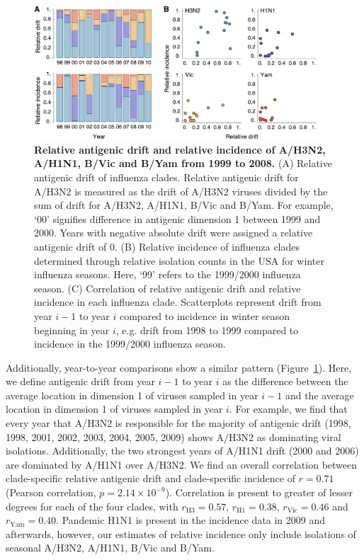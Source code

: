 \documentclass[11pt,oneside,letterpaper]{article}
\begin{document}
\begin{figure}[tb]
	\centering		
	\includegraphics[width=0.95\textwidth]{figures/incidence}
	\caption{\textbf{Relative antigenic drift and relative incidence of A/H3N2, A/H1N1, B/Vic and B/Yam from 1999 to 2008.} 
	(A) Relative antigenic drift of influenza clades.
	Relative antigenic drift for A/H3N2 is measured as the drift of A/H3N2 viruses divided by the sum of drift for A/H3N2, A/H1N1, B/Vic and B/Yam.
	For example, `00' signifies difference in antigenic dimension 1 between 1999 and 2000.
	Years with negative absolute drift were assigned a relative antigenic drift of 0.
	(B) Relative incidence of influenza clades determined through relative isolation counts in the USA for winter influenza seasons.
	Here, `99' refers to the 1999/2000 influenza season.
	(C) Correlation of relative antigenic drift and relative incidence in each influenza clade.
	Scatterplots represent drift from year $i-1$ to year $i$ compared to incidence in winter season beginning in year $i$, e.g. drift from 1998 to 1999 compared to incidence in the 1999/2000 influenza season.
	} 
	\label{incidence} 
\end{figure}

Additionally, year-to-year comparisons show a similar pattern (Figure~\ref{incidence}). 
Here, we define antigenic drift from year $i-1$ to year $i$ as the difference between the average location in dimension 1 of viruses sampled in year $i-1$ and the average location in dimension 1 of viruses sampled in year $i$.
For example, we find that every year that A/H3N2 is responsible for the majority of antigenic drift (1998, 1998, 2001, 2002, 2003, 2004, 2005, 2009) shows A/H3N2 as dominating viral isolations.
Additionally, the two strongest years of A/H1N1 drift (2000 and 2006) are dominated by A/H1N1 over A/H3N2.
We find an overall correlation between clade-specific relative antigenic drift and clade-specific incidence of $r = 0.71$ (Pearson correlation, $p = 2.14 \times 10^{-9}$).
Correlation is present to greater of lesser degrees for each of the four clades, with $r_\mathrm{H3} = 0.57$, $r_\mathrm{H1} = 0.38$, $r_\mathrm{Vic} = 0.46$ and $r_\mathrm{Yam} = 0.40$.
Pandemic H1N1 is present in the incidence data in 2009 and afterwards, however, our estimates of relative incidence only include isolations of seasonal A/H3N2, A/H1N1, B/Vic and B/Yam.
\end{document}
